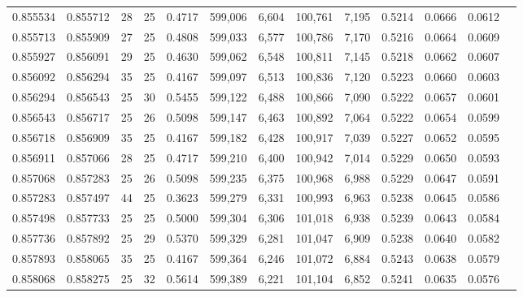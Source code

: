 \begin{tabular}{rrrrrrrrrrrrr}
0.855534 & 0.855712 &    28 &  25 &                                     0.4717 & 599,006 &   6,604 & 100,761 &   7,195 & 0.5214 & 0.0666 & 0.0612 \\
0.855713 & 0.855909 &    27 &  25 &                                     0.4808 & 599,033 &   6,577 & 100,786 &   7,170 & 0.5216 & 0.0664 & 0.0609 \\
0.855927 & 0.856091 &    29 &  25 &                                     0.4630 & 599,062 &   6,548 & 100,811 &   7,145 & 0.5218 & 0.0662 & 0.0607 \\
0.856092 & 0.856294 &    35 &  25 &                                     0.4167 & 599,097 &   6,513 & 100,836 &   7,120 & 0.5223 & 0.0660 & 0.0603 \\
0.856294 & 0.856543 &    25 &  30 &                                     0.5455 & 599,122 &   6,488 & 100,866 &   7,090 & 0.5222 & 0.0657 & 0.0601 \\
0.856543 & 0.856717 &    25 &  26 &                                     0.5098 & 599,147 &   6,463 & 100,892 &   7,064 & 0.5222 & 0.0654 & 0.0599 \\
0.856718 & 0.856909 &    35 &  25 &                                     0.4167 & 599,182 &   6,428 & 100,917 &   7,039 & 0.5227 & 0.0652 & 0.0595 \\
0.856911 & 0.857066 &    28 &  25 &                                     0.4717 & 599,210 &   6,400 & 100,942 &   7,014 & 0.5229 & 0.0650 & 0.0593 \\
0.857068 & 0.857283 &    25 &  26 &                                     0.5098 & 599,235 &   6,375 & 100,968 &   6,988 & 0.5229 & 0.0647 & 0.0591 \\
0.857283 & 0.857497 &    44 &  25 &                                     0.3623 & 599,279 &   6,331 & 100,993 &   6,963 & 0.5238 & 0.0645 & 0.0586 \\
0.857498 & 0.857733 &    25 &  25 &                                     0.5000 & 599,304 &   6,306 & 101,018 &   6,938 & 0.5239 & 0.0643 & 0.0584 \\
0.857736 & 0.857892 &    25 &  29 &                                     0.5370 & 599,329 &   6,281 & 101,047 &   6,909 & 0.5238 & 0.0640 & 0.0582 \\
0.857893 & 0.858065 &    35 &  25 &                                     0.4167 & 599,364 &   6,246 & 101,072 &   6,884 & 0.5243 & 0.0638 & 0.0579 \\
0.858068 & 0.858275 &    25 &  32 &                                     0.5614 & 599,389 &   6,221 & 101,104 &   6,852 & 0.5241 & 0.0635 & 0.0576 \\

\end{tabular}
